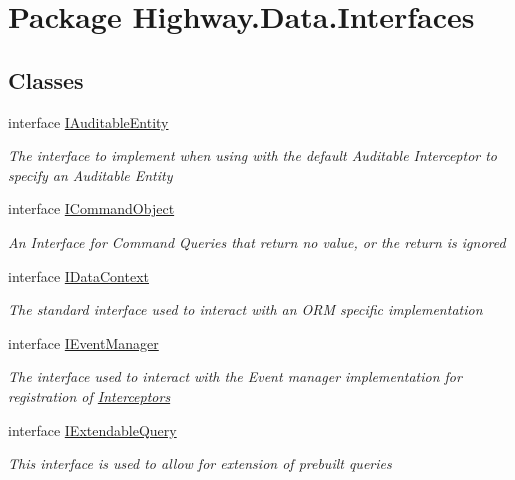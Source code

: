 \hypertarget{namespace_highway_1_1_data_1_1_interfaces}{\section{Package Highway.\-Data.\-Interfaces}
\label{namespace_highway_1_1_data_1_1_interfaces}
}
\subsection*{Classes}
\begin{DoxyCompactItemize}
\item 
interface \hyperlink{interface_highway_1_1_data_1_1_interfaces_1_1_i_auditable_entity}{I\-Auditable\-Entity}
\begin{DoxyCompactList}\small\item\em The interface to implement when using with the default Auditable Interceptor to specify an Auditable Entity \end{DoxyCompactList}\item 
interface \hyperlink{interface_highway_1_1_data_1_1_interfaces_1_1_i_command_object}{I\-Command\-Object}
\begin{DoxyCompactList}\small\item\em An Interface for Command Queries that return no value, or the return is ignored \end{DoxyCompactList}\item 
interface \hyperlink{interface_highway_1_1_data_1_1_interfaces_1_1_i_data_context}{I\-Data\-Context}
\begin{DoxyCompactList}\small\item\em The standard interface used to interact with an O\-R\-M specific implementation \end{DoxyCompactList}\item 
interface \hyperlink{interface_highway_1_1_data_1_1_interfaces_1_1_i_event_manager}{I\-Event\-Manager}
\begin{DoxyCompactList}\small\item\em The interface used to interact with the Event manager implementation for registration of \hyperlink{namespace_highway_1_1_data_1_1_interceptors}{Interceptors} \end{DoxyCompactList}\item 
interface \hyperlink{interface_highway_1_1_data_1_1_interfaces_1_1_i_extendable_query}{I\-Extendable\-Query}
\begin{DoxyCompactList}\small\item\em This interface is used to allow for extension of prebuilt queries \end{DoxyCompactList}\item 

\end{DoxyCompactItemize}
